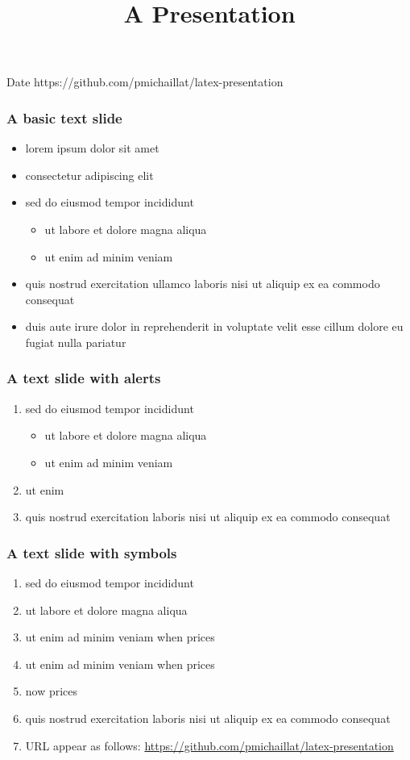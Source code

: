 \documentclass[12pt,xcolor={dvipsnames},hyperref={pdftex,pdfpagemode=UseNone,hidelinks,pdfdisplaydoctitle=true},usepdftitle=false]{beamer}
\begin{document}
\title{A Presentation}
%
{Date}%
{https://github.com/pmichaillat/latex-presentation}
\frame[plain]{\titlepage}

\begin{frame}
\frametitle{A basic text slide}
\begin{itemize}
\item lorem ipsum dolor sit amet
\item consectetur adipiscing elit
\item sed do eiusmod tempor incididunt
\begin{itemize}
\item ut labore et dolore magna aliqua
\item ut enim ad minim veniam
\end{itemize}
\item quis nostrud exercitation ullamco laboris nisi ut aliquip ex ea commodo consequat
\item duis aute irure dolor in reprehenderit in voluptate velit esse cillum dolore eu fugiat nulla pariatur
\end{itemize}
\end{frame}

\begin{frame}
\frametitle{A text slide with alerts}
\begin{enumerate}
\item sed do eiusmod tempor incididunt
\begin{itemize}
\item ut labore et dolore magna aliqua
\item ut enim ad minim veniam
\end{itemize}
\item ut enim 
\item quis nostrud exercitation  laboris nisi ut aliquip ex ea commodo consequat
\end{enumerate}
\end{frame}

\begin{frame}
\frametitle{A text slide with symbols}
\begin{enumerate}
\item sed do eiusmod tempor \so incididunt
\item ut labore et dolore \then magna aliqua
\item ut enim ad minim veniam when prices \up
\item ut enim ad minim veniam when prices \down
\item now prices \flat 
\item quis nostrud exercitation laboris nisi ut aliquip \then ex ea commodo consequat
\item URL appear as follows: \url{https://github.com/pmichaillat/latex-presentation}
\end{enumerate}
\end{frame}
\end{document}

